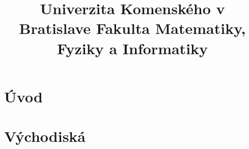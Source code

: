 \documentclass[12pt,a4paper]{bachelor}
\title{Univerzita Komenského v Bratislave Fakulta Matematiky, Fyziky a Informatiky}
\author{\autor}
\begin{document}


\tableofcontents
\newpage

\chapter{Úvod}


\chapter{Východiská}


\printbibliography

\label{totalpages}
\end{document}
